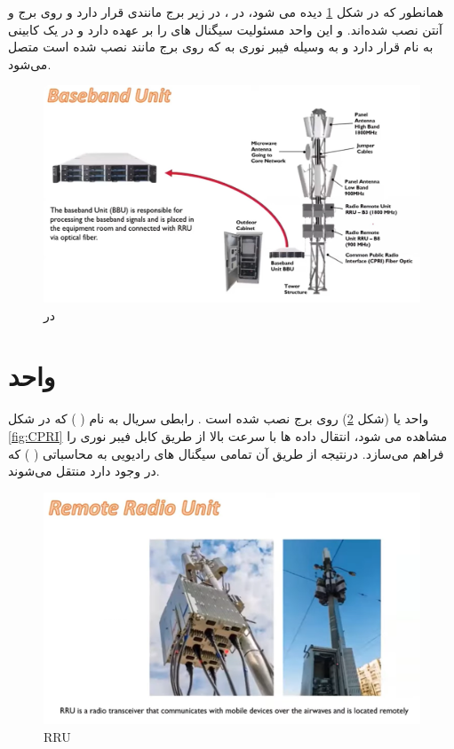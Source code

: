 \documentclass[landscape, 12pt]{report}
\begin{document}
  همانطور که در شکل \ref{fig:Baseband_Unit} دیده می شود، در 
  ،
     در زیر برج مانندی قرار دارد و روی برج
       و آنتن نصب شده‌اند. و این واحد مسئولیت سیگنال های
         را بر عهده دارد و در یک کابینی به نام
           قرار دارد و به وسیله فیبر نوری به
             که روی برج مانند نصب شده است متصل می‌شود. 
 \begin{figure}[ht]
 	\centering
 	\includegraphics[width=.6\linewidth]{Pic/Baseband_Unit}
 	\caption{
 	در
 	}
 	\label{fig:Baseband_Unit}
 \end{figure}

\section*{واحد
}
واحد
  یا
   (شکل \ref{fig:RRU}) روی برج نصب شده است . رابطی سریال به نام
      ( 
    ) که در شکل \ref{fig:CPRI} مشاهده می شود، انتقال داده ها با سرعت بالا از طریق کابل فیبر نوری را فراهم می‌سازد. درنتیجه از طریق آن تمامی سیگنال های رادیویی به
      محاسباتی (
       ) که در
         وجود دارد منتقل می‌شوند.
   
\begin{figure}[ht]
	\centering
	\includegraphics[width=.6\linewidth]{Pic/Remote_Radio_Unit}
	\caption{RRU}
	\label{fig:RRU}
\end{figure}
\end{document}
